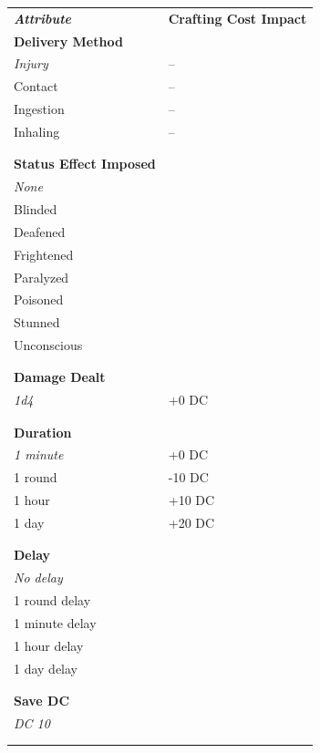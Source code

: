 \documentclass{report}
\begin{document}
\begin{tabular}{ll}
{\it \bf Attribute} & {\bf Crafting Cost Impact} \\
{\bf Delivery Method} &\\
{\it Injury} & -- \\
Contact      & -- \\
Ingestion    & -- \\
Inhaling     & -- \\
&\\
&\\
{\bf Status Effect Imposed }&\\
{\it None}  &\\
Blinded     &\\
Deafened    &\\
Frightened  &\\
Paralyzed   &\\
Poisoned    &\\
Stunned     &\\
Unconscious &\\
&\\
&\\
{\bf Damage Dealt }&\\
{\it 1d4}  & +0 DC  \\
&\\
&\\
{\bf Duration }&\\
{\it 1 minute}  & +0 DC  \\
1 round   & -10 DC \\
1 hour    & +10 DC \\
1 day     & +20 DC \\
&\\
&\\
{\bf Delay }&\\
{\it No delay} &\\
1 round delay  &\\
1 minute delay &\\
1 hour delay   &\\
1 day delay    &\\
&\\
&\\
{\bf Save DC } &\\
{\it DC 10} &\\
&\\
&\\
\end{tabular}
\end{document}
